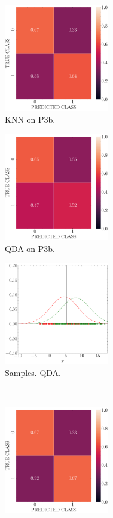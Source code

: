 \documentclass[11pt, a4 paper]{article}
\begin{document}
\begin{figure}[!htbp]
\centering
    \begin{subfigure}[!htbp]{0.24\textwidth}
       \centering
       \includegraphics[width=1.8in]{../results/ex3/conf_mtx_KNN_dataset_P3b_size_199.pdf}
       \caption{KNN on P3b.}
       \label{fig:KNN_P3b}
    \end{subfigure}
\quad    
    \begin{subfigure}[!htbp]{0.24\textwidth}
       \centering
       \includegraphics[width=1.8in]{../results/ex3/conf_mtx_QD_ML_dataset_P3b_size_199.pdf}
       \caption{QDA on P3b.}
       \label{fig:QDA_P3b}
    \end{subfigure}
\quad    
    \begin{subfigure}[!htbp]{0.24\textwidth}
       \centering
       \includegraphics[width=1.8in]{../results/ex3/samples_QD_ML_dataset_P3b_size_199.pdf}
       \caption{Samples. QDA.}
       \label{fig:DF_QDA_P3b}
    \end{subfigure}
\\
    \begin{subfigure}[!htbp]{0.24\textwidth}
       \centering
       \includegraphics[width=1.8in]{../results/ex3/conf_mtx_GMM_dataset_P3b_size_199.pdf}

\end{subfigure}
\end{figure}
\end{document}
